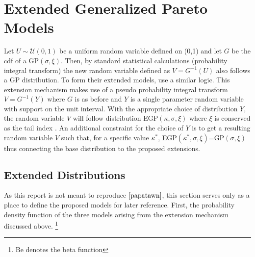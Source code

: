 \documentclass[12pt]{article}
\theoremstyle{definition}
\theoremstyle{definition}
\begin{document}
\section{Extended Generalized Pareto Models}
Let $U\sim \mathcal{U}(0,1)$ be a uniform random variable defined on (0,1) and let $G$ be the cdf of a GP$(\sigma,\xi)$. Then, by standard statistical calculations (probability integral transform) the new random variable defined as $V=G^{-1}(U)$ also follows a GP distribution. To form their extended models, \cite{papatawn} use a similar logic. This extension mechanism makes use of a pseudo probability integral transform $V=G^{-1}(Y)$ where $G$ is as before and $Y$ is a single parameter random variable with support on the unit interval. With the appropriate choice of distribution $Y$, the random variable $V$ will follow distribution EGP$(\kappa, \sigma,\xi)$ where $\xi$ is conserved as the tail index \cite{papatawn}. An additional constraint for the choice of $Y$ is to get a resulting random variable $V$ such that, for a specific value $\kappa^*$, EGP$(\kappa^*, \sigma,\xi)$=GP$(\sigma,\xi)$ thus connecting the base distribution to the proposed extensions. 

\subsection{Extended Distributions}
As this report is not meant to reproduce $\cite{papatawn}$, this section serves only as a place to define the proposed models for later reference. First, the probability density function of the three models  arising from the extension mechanism discussed above.
\footnote{Be denotes the beta function}
\end{document}
